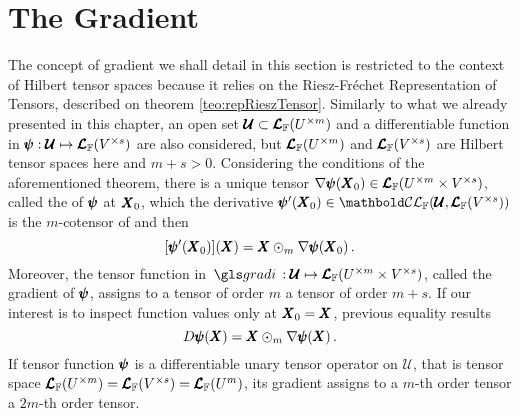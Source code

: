 
\section{The Gradient}

The concept of gradient we shall detail in this section is restricted to the context of Hilbert tensor spaces because it relies on the Riesz-Fr\'echet Representation of Tensors, described on theorem \ref{teo:repRieszTensor}. Similarly to what we already presented in this chapter, an open set $\pmb{\mathcal{U}}\subset\pmb{\mathcal{L}}_{\mathbb{F}}(U^{\times m})$ and a differentiable function in $\pmb{\psi} : \pmb{\mathcal{U}} \mapsto \pmb{\mathcal{L}}_{\mathbb{F}}(V^{\times s})$ are also considered, but $\pmb{\mathcal{L}}_{\mathbb{F}}(U^{\times m})$ and $\pmb{\mathcal{L}}_{\mathbb{F}}(V^{\times s})$ are Hilbert tensor spaces here and $m+s>0$. Considering the conditions of the aforementioned theorem, there is a unique tensor $\nabla\pmb{\psi}(\pmb{X}_0)\in\pmb{\mathcal{L}}_{\mathbb{F}}(U^{\times m}\times V^{\times s})$, called the  of $\pmb{\psi}$ at $\pmb{X}_0$, which the derivative $\fua{\tnr{\psi}'}{\tnr{X}_0}\in\evlc{\cam{F}}{\pmb{\mathcal{U}}}{\ete{\cam{F}}{V^{\times s}}}$ is the $m$-cotensor of and then
\begin{equation}\label{eq:defGradient}
[\pmb{\psi}'(\pmb{X}_0)](\pmb{X}) = \pmb{X}\odot_m\nabla\pmb{\psi}(\pmb{X}_0)\,.
\end{equation}
Moreover, the tensor function in $\map{\gloref{gradi}}{\pmb{\mathcal{U}}}{\ete{\cam{F}}{U^{\times m}\times V^{\times s}}}$, called the gradient of $\pmb{\psi}$, assigns to a tensor of order $m$ a tensor of order $m+s$. If our interest is to inspect function values only at $\pmb{X}_0=\pmb{X}$, previous equality results
\begin{equation}\label{eq:derivSameArg}
D\pmb{\psi}(\pmb{X}) = \pmb{X}\odot_m\nabla\pmb{\psi}(\pmb{X})\,.
\end{equation}
If tensor function $\pmb{\psi}$ is a differentiable unary tensor operator on $\pmb{\mathcal{U}}$, that is tensor space $\pmb{\mathcal{L}}_{\mathbb{F}}(U^{\times m})=\pmb{\mathcal{L}}_{\mathbb{F}}(V^{\times s})=\pmb{\mathcal{L}}_{\mathbb{F}}(U^{m})$, its gradient assigns to a $m$-th order tensor a $2m$-th order tensor. 

